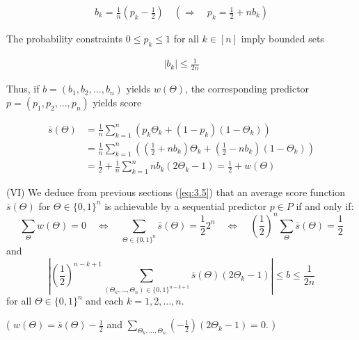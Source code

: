 \documentclass[11pt]{article}
\numberwithin{equation}{section}
\theoremstyle{boldStyle}
\begin{document}
\begin{align} \label{eq:4.2}
    b_k = \frac{1}{n} (p_k - \frac{1}{2}) \quad  \left(  \Rightarrow \quad p_k = \frac{1}{2} + n b_k \right)
\end{align}


The probability constraints $0 \leq p_k \leq 1$ for all $k \in [n]$ imply bounded sets 

\begin{align} \label{eq:4.3}
    \left| b_k \right| \leq \frac{1}{2n}
\end{align}

Thus, if $b = (b_1, b_2, \ldots, b_n)$ yields $w(\Theta)$, the corresponding predictor $p = (p_1, p_2, \ldots, p_n)$ yields score 

\begin{equation} \label{eq:4.4}
    \begin{aligned}
        \bar{s}(\Theta) &= \frac{1}{n} \sum_{k=1}^{n} \left( p_k \Theta_k + (1 - p_k)(1 - \Theta_k) \right) \\
            &= \frac{1}{n} \sum_{k=1}^{n} \left( (\frac{1}{2} + n b_k ) \Theta_k + (\frac{1}{2} - n b_k)(1 - \Theta_k) \right) \\ 
            &= \frac{1}{2} + \frac{1}{n} \sum_{k=1}^{n} n b_k(2 \Theta_k - 1) = \frac{1}{2} + w(\Theta)
    \end{aligned}
\end{equation}


\begin{boxA}
    (VI) We deduce from previous sections (\ref{eq:3.5}) that an average score function $\bar{s}(\Theta)$ for 
    $\Theta \in \{0, 1\}^n$ is achievable by a sequential predictor
    $p \in P$ if and only if:
    \begin{equation} \label{eq:4.5}
        \sum_{\Theta} w(\Theta) = 0 \quad 
        \iff \quad \sum_{\Theta \in \{0, 1\}^n} \bar{s}(\Theta) = \frac{1}{2}  2^n \quad 
        \iff \quad \left(\frac{1}{2}\right)^n \sum_{\Theta} \bar{s}(\Theta) = \frac{1}{2}
    \end{equation}
    and
    \begin{equation} \label{eq:4.6}
        \left| \left(\frac{1}{2}\right)^{n-k+1} \sum_{(\Theta_k, \ldots, \Theta_n) \in \{0,1\}^{n-k+1}} \bar{s}(\Theta) (2\Theta_k - 1) \right| \leq b \leq \frac{1}{2n}
    \end{equation}
    for all $\Theta \in \{0, 1\}^n$ and each $k = 1, 2, \ldots, n$.
\end{boxA}

(
    $w(\Theta) = \bar{s}(\Theta) - \frac{1}{2}$ and $\sum_{\Theta_k, \ldots, \Theta_n} (-\frac{1}{2}) (2\Theta_k - 1) = 0$.
)
\end{document}
